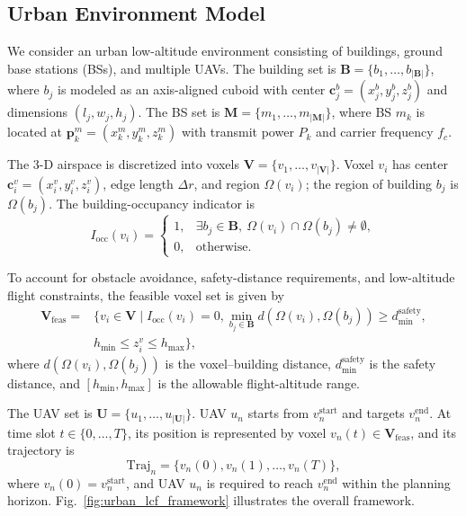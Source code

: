 \documentclass[10pt,journal,letterpaper]{IEEEtran}
\begin{document}
\subsection{Urban Environment Model}

We consider an urban low-altitude environment consisting of buildings, ground base stations (BSs), and multiple UAVs. The building set is $\mathbf{B}=\{b_1,\ldots,b_{|\mathbf{B}|}\}$, where $b_j$ is modeled as an axis-aligned cuboid with center $\mathbf{c}_j^b=(x_j^b,y_j^b,z_j^b)$ and dimensions $(l_j,w_j,h_j)$. The BS set is $\mathbf{M}=\{m_1,\ldots,m_{|\mathbf{M}|}\}$, where BS $m_k$ is located at $\mathbf{p}_k^m=(x_k^m,y_k^m,z_k^m)$ with transmit power $P_k$ and carrier frequency $f_c$.

The 3-D airspace is discretized into voxels $\mathbf{V}=\{v_1,\ldots,v_{|\mathbf{V}|}\}$. Voxel $v_i$ has center $\mathbf{c}_i^v=(x_i^v,y_i^v,z_i^v)$, edge length $\Delta r$, and region $\Omega(v_i)$; the region of building $b_j$ is $\Omega(b_j)$. The building-occupancy indicator is
\begin{equation}
I_{\mathrm{occ}}(v_i)=
\begin{cases}
1, & \exists b_j\in\mathbf{B},\ \Omega(v_i)\cap\Omega(b_j)\neq\emptyset,\\
0, & \mathrm{otherwise}.
\end{cases}
\end{equation}

To account for obstacle avoidance, safety-distance requirements, and low-altitude flight constraints, the feasible voxel set is given by
\begin{equation}
\begin{aligned}
\mathbf{V}_{\mathrm{feas}}=&\{v_i\in\mathbf{V}\mid I_{\mathrm{occ}}(v_i)=0,\min_{b_j\in\mathbf{B}}d(\Omega(v_i),\Omega(b_j))\ge d_{\min}^{\mathrm{safety}},\\
& h_{\min}\le z_i^v\le h_{\max}\},
\end{aligned}
\end{equation}
where $d(\Omega(v_i),\Omega(b_j))$ is the voxel--building distance, $d_{\min}^{\mathrm{safety}}$ is the safety distance, and $[h_{\min},h_{\max}]$ is the allowable flight-altitude range.

The UAV set is $\mathbf{U}=\{u_1,\ldots,u_{|\mathbf{U}|}\}$. UAV $u_n$ starts from $v_n^{\mathrm{start}}$ and targets $v_n^{\mathrm{end}}$. At time slot $t\in\{0,\ldots,T\}$, its position is represented by voxel $v_n(t)\in\mathbf{V}_{\mathrm{feas}}$, and its trajectory is
\begin{equation}
\mathrm{Traj}_n=\{v_n(0),v_n(1),\ldots,v_n(T)\},
\end{equation}
where $v_n(0)=v_n^{\mathrm{start}}$, and UAV $u_n$ is required to reach $v_n^{\mathrm{end}}$ within the planning horizon. Fig.~\ref{fig:urban_lcf_framework} illustrates the overall framework.
\end{document}
